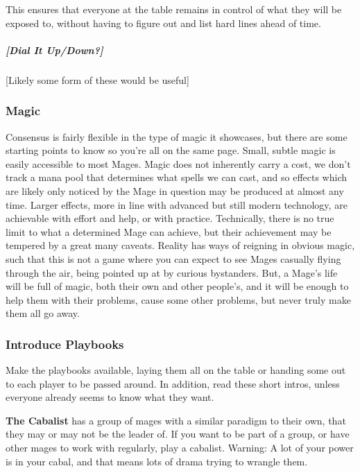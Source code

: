 \documentclass[
]{article}
\begin{document}
This ensures that everyone at the table remains in control of what they
will be exposed to, without having to figure out and list hard lines
ahead of time.

\hypertarget{dial-it-updown}{%
\subparagraph{{[}Dial It Up/Down?{]}}\label{dial-it-updown}}

{[}Likely some form of these would be useful{]}

\hypertarget{magic}{%
\subsubsection{Magic}\label{magic}}

Consensus is fairly flexible in the type of magic it showcases, but
there are some starting points to know so you're all on the same page.
Small, subtle magic is easily accessible to most Mages. Magic does not
inherently carry a cost, we don't track a mana pool that determines what
spells we can cast, and so effects which are likely only noticed by the
Mage in question may be produced at almost any time. Larger effects,
more in line with advanced but still modern technology, are achievable
with effort and help, or with practice. Technically, there is no true
limit to what a determined Mage can achieve, but their achievement may
be tempered by a great many caveats. Reality has ways of reigning in
obvious magic, such that this is not a game where you can expect to see
Mages casually flying through the air, being pointed up at by curious
bystanders. But, a Mage's life will be full of magic, both their own and
other people's, and it will be enough to help them with their problems,
cause some other problems, but never truly make them all go away.

\hypertarget{introduce-playbooks}{%
\subsubsection{Introduce Playbooks}\label{introduce-playbooks}}

Make the playbooks available, laying them all on the table or handing
some out to each player to be passed around. In addition, read these
short intros, unless everyone already seems to know what they want.

\textbf{The Cabalist} has a group of mages with a similar paradigm to
their own, that they may or may not be the leader of. If you want to be
part of a group, or have other mages to work with regularly, play a
cabalist. Warning: A lot of your power is in your cabal, and that means
lots of drama trying to wrangle them.
\end{document}
